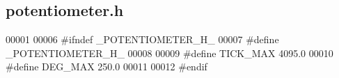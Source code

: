\subsection{potentiometer.\+h}
\label{potentiometer_8h_source}

\begin{DoxyCode}
00001 
00006 \textcolor{preprocessor}{#ifndef \_POTENTIOMETER\_H\_}
00007 \textcolor{preprocessor}{#define \_POTENTIOMETER\_H\_}
00008 
00009 \textcolor{preprocessor}{#define TICK\_MAX 4095.0}
00010 \textcolor{preprocessor}{#define DEG\_MAX 250.0}
00011 
00012 \textcolor{preprocessor}{#endif}
\end{DoxyCode}
